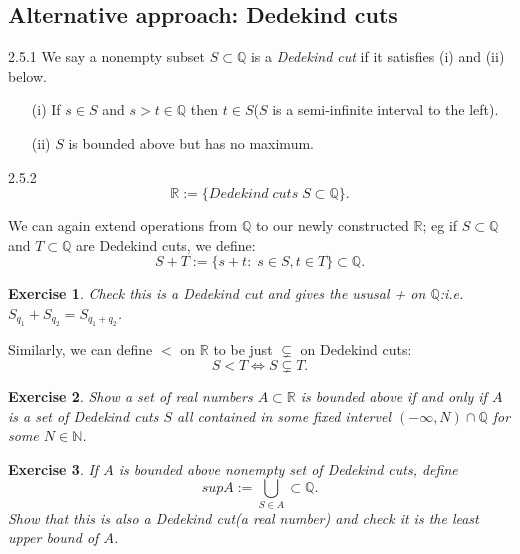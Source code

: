 \documentclass[a4paper]{article}
\def\rr{{\mathbb R}}
\def\qq{{\mathbb Q}}
\def\nn{{\mathbb N}}
\newtheorem{exercise}{Exercise}[subsection]
\begin{document}
\subsection{Alternative approach: Dedekind cuts}
\begin{definition}{2.5.1}{}
    We say a nonempty subset $S\subset\qq$ is a \textit{Dedekind cut} if it satisfies (i) and (ii) below.
    \begin{enumerate}
        \item[(i)] If $s\in S$ and $s>t\in \qq$ then $ t\in S$($S$ is a semi-infinite interval to the left).
        \item[(ii)] $S$ is bounded above but has no maximum.  
    \end{enumerate}
\end{definition}
\begin{definition}{2.5.2}{}
    \begin{equation*}
        \rr:= \{Dedekind\; cuts\;S\subset \qq\}.
    \end{equation*}
\end{definition}
We can again extend operations from $\qq$ to our newly constructed $\rr$; eg if $S \subset \qq$ and $T \subset \qq$ are Dedekind cuts, we define:
\begin{equation*}
    S+T:=\{s+t:\; s\in S, t\in T\}\subset \qq.
\end{equation*}
\begin{exercise}
    Check this is a Dedekind cut and gives the ususal + on $\qq$:i.e. $S_{q_1}+S_{q_2}=S_{q_1+q_2}$.
\end{exercise}
Similarly, we can define $<$ on $\rr$ to be just $\subsetneq$ on Dedekind cuts:
\begin{equation*}
S<T \Longleftrightarrow S\subsetneq T.
\end{equation*}
\begin{exercise}
    Show a set of real numbers $A \subset \rr$ is bounded above if and only if $A$ is a set of Dedekind cuts $S$ all contained in some fixed intervel $(-\infty,N)\cap \qq$ for some $N \in \nn$.
\end{exercise}
\begin{exercise}
    If $A$ is bounded above nonempty set of Dedekind cuts, define
    \begin{equation*}
        sup A := \bigcup _{S\in A} \subset \qq.
    \end{equation*} 
    Show that this is also a Dedekind cut(a real number) and check it is the least upper bound of $A$.
\end{exercise}
\end{document}
